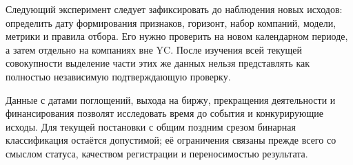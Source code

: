 Следующий эксперимент следует зафиксировать до наблюдения новых исходов: определить дату формирования признаков, горизонт, набор компаний, модели, метрики и правила отбора. Его нужно проверить на новом календарном периоде, а затем отдельно на компаниях вне YC. После изучения всей текущей совокупности выделение части этих же данных нельзя представлять как полностью независимую подтверждающую проверку.

Данные с датами поглощений, выхода на биржу, прекращения деятельности и финансирования позволят исследовать время до события и конкурирующие исходы. Для текущей постановки с общим поздним срезом бинарная классификация остаётся допустимой; её ограничения связаны прежде всего со смыслом статуса, качеством регистрации и переносимостью результата.
\clearpage
